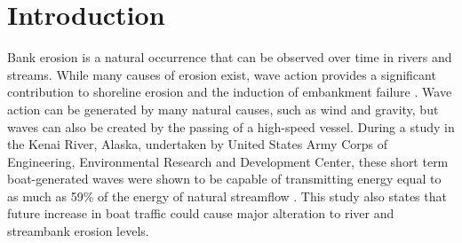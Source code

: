 \documentclass[
10pt, %
letterpaper, %
twoside, %
headinclude,footinclude, %
BCOR5mm, %
]{scrartcl}
\begin{document}
%


\newpage %
\linenumbers


\section{Introduction}\label{sec:Intro}

\large

Bank erosion is a natural occurrence that can be observed over time in rivers and streams. While many causes of erosion exist, wave action provides a significant contribution to shoreline erosion and the induction of embankment failure \cite{ozeren2016boat}. Wave action can be generated by many natural causes, such as wind and gravity, but waves can also be created by the passing of a high-speed vessel. During a study in the Kenai River, Alaska, undertaken by United States Army Corps of Engineering, Environmental Research and Development Center, these short term boat-generated waves were shown to be capable of transmitting energy equal to as much as 59\% of the energy of  natural streamflow \cite{maynord2008boat}. This study also states that future increase in boat traffic could cause major alteration to river and streambank erosion levels. 
\end{document}
